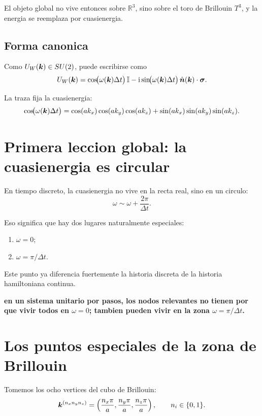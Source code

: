 El objeto global no vive entonces sobre \(\mathbb{R}^3\), sino sobre el toro de Brillouin \(T^3\), y la energia se reemplaza por cuasienergia.

\subsection{Forma canonica}
Como \(U_W(\bm{k})\in SU(2)\), puede escribirse como
\begin{equation}
U_W(\bm{k})=
\cos\!\bigl(\omega(\bm{k})\Delta t\bigr)\,\mathbb{I}
-\mathrm{i} \sin\!\bigl(\omega(\bm{k})\Delta t\bigr)\,\hat{\bm{n}}(\bm{k})\cdot\bm{\sigma}.
\label{c32:eq:canon}
\end{equation}

La traza fija la cuasienergia:
\begin{equation}
\cos\!\bigl(\omega(\bm{k})\Delta t\bigr)
=
\cos(ak_x)\cos(ak_y)\cos(ak_z)
+ \sin(ak_x)\sin(ak_y)\sin(ak_z).
\label{c32:eq:omega}
\end{equation}

\section{Primera leccion global: la cuasienergia es circular}
En tiempo discreto, la cuasienergia no vive en la recta real, sino en un circulo:
\begin{equation}
\omega \sim \omega + \frac{2\pi}{\Delta t}.
\end{equation}

Eso significa que hay dos lugares naturalmente especiales:
\begin{enumerate}[label=\arabic*.]
    \item \(\omega = 0\);
    \item \(\omega = \pi/\Delta t\).
\end{enumerate}

Este punto ya diferencia fuertemente la historia discreta de la historia hamiltoniana continua.

\begin{displayquote}
\textbf{en un sistema unitario por pasos, los nodos relevantes no tienen por que vivir todos en \(\omega=0\); tambien pueden vivir en la zona \(\omega=\pi/\Delta t\).}
\end{displayquote}

\section{Los puntos especiales de la zona de Brillouin}
Tomemos los ocho vertices del cubo de Brillouin:
\begin{equation}
\bm{k}^{(n_x n_y n_z)}=
\left(
\frac{n_x\pi}{a},
\frac{n_y\pi}{a},
\frac{n_z\pi}{a}
\right),
\qquad
n_i\in\{0,1\}.
\label{c32:eq:corners}
\end{equation}

